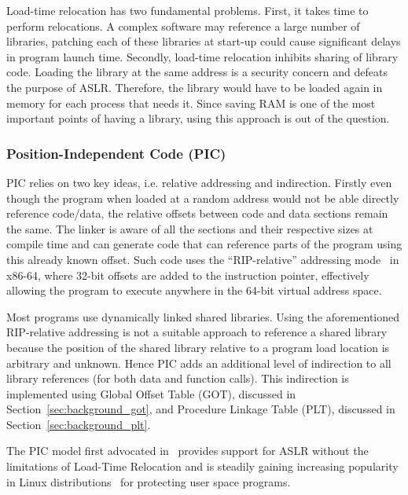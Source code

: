 Load-time relocation has two fundamental problems.
First, it takes time to perform relocations. A complex software may reference a large number of libraries, patching each of these libraries at start-up could cause significant delays in program launch time.
Secondly, load-time relocation inhibits sharing of library code. %
Loading the library at the same address is a security concern and defeats the purpose of ASLR. Therefore, the library would have to be loaded again in memory for each process that needs it. Since saving RAM is one of the most important points of having a library, using this approach is out of the question.

\subsubsection*{Position-Independent Code (PIC)}
\label{sec:bg:pic}
PIC relies on two key ideas, i.e. relative addressing and indirection. Firstly even though the program when loaded at a random address would not be able directly reference code/data, the relative offsets between code and data sections remain the same. The linker is aware of all the sections and their respective sizes at compile time and can generate code that can reference parts of the program using this already known offset. Such code uses the ``RIP-relative'' addressing mode~\cite{INTEL,AMD} in x86-64, where 32-bit offsets are added to the instruction pointer, effectively allowing the program to execute anywhere in the 64-bit virtual address space.

Most programs use dynamically linked shared libraries. Using the aforementioned RIP-relative addressing is not a suitable approach to reference a shared library because the position of the shared library relative to a program load location is arbitrary and unknown. Hence PIC adds an additional level of indirection to all library references (for both data and function calls). This indirection is implemented using Global Offset Table (GOT), discussed in Section~\ref{sec:background_got}, and Procedure Linkage Table (PLT), discussed in Section~\ref{sec:background_plt}.

The PIC model first advocated in~\cite{LIBCRET} provides support for ASLR without the limitations of Load-Time Relocation and is steadily gaining increasing popularity in Linux distributions~\cite{UBUNTUPIE} for protecting user space programs.

